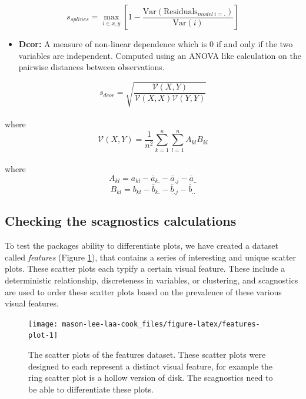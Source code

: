 \[s_{splines}=\max_{i\in x,y}\left[ 1-\frac{\mbox{Var}(\mbox{Residuals}_{model~i=.})}{\mbox{Var}(i)}\right] \]

\begin{itemize}
\tightlist
\item
  \textbf{Dcor:} A measure of non-linear dependence which is 0 if and only if the two variables are independent. Computed using an ANOVA like calculation on the pairwise distances between observations.
\end{itemize}

\[s_{dcor}= \sqrt{\frac{\mathcal{V}(X,Y)}{\mathcal{V}(X,X)\mathcal{V}(Y,Y)}}\]\\
where
\[\mathcal{V}
(X,Y)=\frac{1}{n^2}\sum_{k=1}^n\sum_{l=1}^nA_{kl}B_{kl}\]\\
where
\[A_{kl}=a_{kl}-\bar{a}_{k.}-\bar{a}_{.j}-\bar{a}_{..}\]
\[B_{kl}=b_{kl}-\bar{b}_{k.}-\bar{b}_{.j}-\bar{b}_{..}\]

\subsection{Checking the scagnostics calculations}\label{checking-the-scagnostics-calculations}

To test the packages ability to differentiate plots, we have created a dataset called \emph{features} (Figure \ref{fig:features-plot}), that contains a series of interesting and unique scatter plots. These scatter plots each typify a certain visual feature. These include a deterministic relationship, discreteness in variables, or clustering, and scagnostics are used to order these scatter plots based on the prevalence of these various visual features.

\begin{figure}
\texttt{[image: mason-lee-laa-cook\_files/figure-latex/features-plot-1]} \caption{The scatter plots of the features dataset. These scatter plots were designed to each represent a distinct visual feature, for example the ring scatter plot is a hollow version of disk. The scagnostics need to be able to differentiate these plots.}\label{fig:features-plot}
\end{figure}

